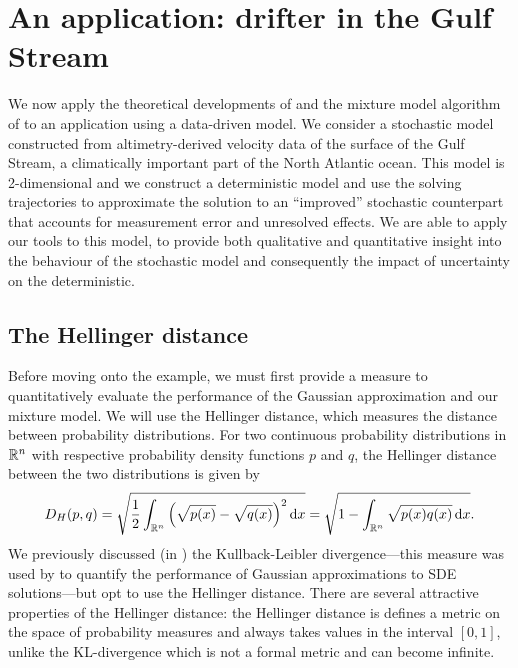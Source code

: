 \chapter{An application: drifter in the Gulf Stream}\label{ch:appls}
We now apply the theoretical developments of  and the mixture model algorithm of  to an application using a data-driven model.
We consider a stochastic model constructed from altimetry-derived velocity data of the surface of the Gulf Stream, a climatically important part of the North Atlantic ocean.
This model is 2-dimensional and we construct a deterministic model and use the solving trajectories to approximate the solution to an ``improved'' stochastic counterpart that accounts for measurement error and unresolved effects.
We are able to apply our tools to this model, to provide both qualitative and quantitative insight into the behaviour of the stochastic model and consequently the impact of uncertainty on the deterministic.


\section{The Hellinger distance}
Before moving onto the example, we must first provide a measure to quantitatively evaluate the performance of the Gaussian approximation and our mixture model.
We will use the Hellinger distance, which measures the distance between probability distributions.
For two continuous probability distributions in \(\mathbb{R}^n\) with respective probability density functions \(p\) and \(q\), the Hellinger distance between the two distributions is given by \citep{LeCamLoYang_2000_AsymptoticsStatistics}
\begin{equation}\label{eqn:hell_dist}
	D_H\!\left(p, q\right) = \sqrt{\frac12 \int_{\R^n}{\left(\sqrt{p(x)} - \sqrt{q(x)}\right)^2\dif x}} = \sqrt{1 - \int_{\R^n}{\sqrt{p(x)q(x)}\dif x}}.
\end{equation}
We previously discussed (in ) the Kullback-Leibler divergence---this measure was used by \citet{Sanz-AlonsoStuart_2017_GaussianApproximationsSmall} to quantify the performance of Gaussian approximations to SDE solutions---but opt to use the Hellinger distance.
There are several attractive properties of the Hellinger distance: the Hellinger distance is defines a metric on the space of probability measures and always takes values in the interval \([0,1]\), unlike the KL-divergence which is not a formal metric and can become infinite.

